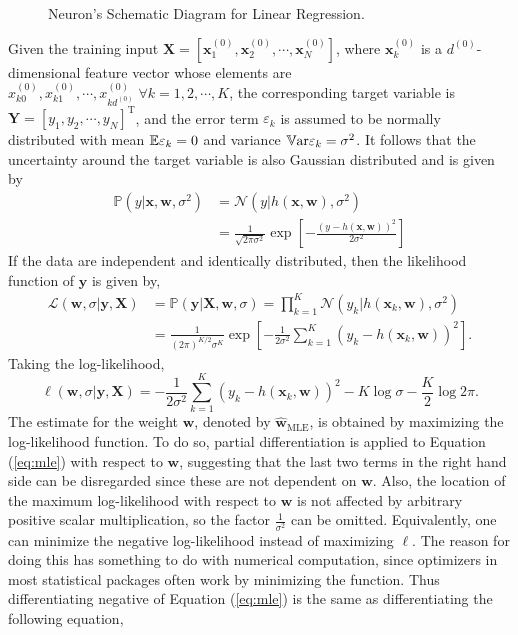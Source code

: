 \begin{figure}[t]
\caption[Neuron's Schematic Diagram for Linear Regression]{\sc Neuron's Schematic Diagram for Linear Regression.}
\label{fig:slrnn}
\end{figure}
Given the training input $\mathbf{X}=[\mathbf{x}_1^{(0)},\mathbf{x}_2^{(0)},\cdots,\mathbf{x}_N^{(0)}]$, where $\mathbf{x}_k^{(0)}$ is a $d^{(0)}$-dimensional feature vector whose elements are $x_{k0}^{(0)},x_{k1}^{(0)},\cdots, x_{kd^{(0)}}^{(0)}\;\forall k=1,2,\cdots,K$, the corresponding target variable is $\mathbf{Y}=[y_1,y_2,\cdots,y_N]^{\mathrm{T}}$, and the error term $\varepsilon_k$ is assumed to be normally distributed with mean $\mathbb{E}\varepsilon_k=0$ and variance $\mathbb{V}\text{ar}\varepsilon_k=\sigma^2$. It follows that the uncertainty around the target variable is also Gaussian distributed and is given by
\begin{align}
\mathbb{P}(y|\mathbf{x},\mathbf{w},\sigma^2)&=\mathcal{N}(y|h(\mathbf{x},\mathbf{w}),\sigma^2)\nonumber\\
&=\frac{1}{\sqrt{2\pi\sigma^{2}}}\exp\left[-\frac{(y-h(\mathbf{x},\mathbf{w}))^2}{2\sigma^{2}}\right]
\end{align}
If the data are independent and identically distributed, then the likelihood function of $\mathbf{y}$ is given by,
\begin{align}
\mathcal{L}(\mathbf{w},\sigma|\mathbf{y},\mathbf{X})&=\mathbb{P}(\mathbf{y}|\mathbf{X},\mathbf{w},\sigma)=\prod_{k=1}^{K}\mathcal{N}(y_k|h(\mathbf{x}_k,\mathbf{w}),\sigma^2)\nonumber\\
&=\frac{1}{(2\pi)^{K/2}\sigma^K}\exp\left[-\frac{1}{2\sigma^2}\sum_{k=1}^{K}(y_k-h(\mathbf{x}_k,\mathbf{w}))^2\right].
\end{align}
Taking the log-likelihood,
\begin{equation}
\label{eq:mle}
\ell(\mathbf{w},\sigma|\mathbf{y},\mathbf{X})=-\frac{1}{2\sigma^2}\sum_{k=1}^K(y_k-h(\mathbf{x}_k,\mathbf{w}))^2-K\log\sigma-\frac{K}{2}\log 2\pi.
\end{equation}
The estimate for the weight $\mathbf{w}$, denoted by $\hat{\mathbf{w}}_{\mathrm{MLE}}$, is obtained by maximizing the log-likelihood function. To do so, partial differentiation is applied to Equation (\ref{eq:mle}) with respect to $\mathbf{w}$, suggesting that the last two terms in the right hand side can be disregarded since these are not dependent on $\mathbf{w}$. Also, the location of the maximum log-likelihood with respect to $\mathbf{w}$ is not affected by arbitrary positive scalar multiplication, so the factor $\frac{1}{\sigma^2}$ can be omitted. Equivalently, one can minimize the negative log-likelihood instead of maximizing $\ell$. The reason for doing this has something to do with numerical computation, since optimizers in most statistical packages often work by minimizing the function. Thus differentiating negative of Equation (\ref{eq:mle}) is the same as differentiating the following equation,
